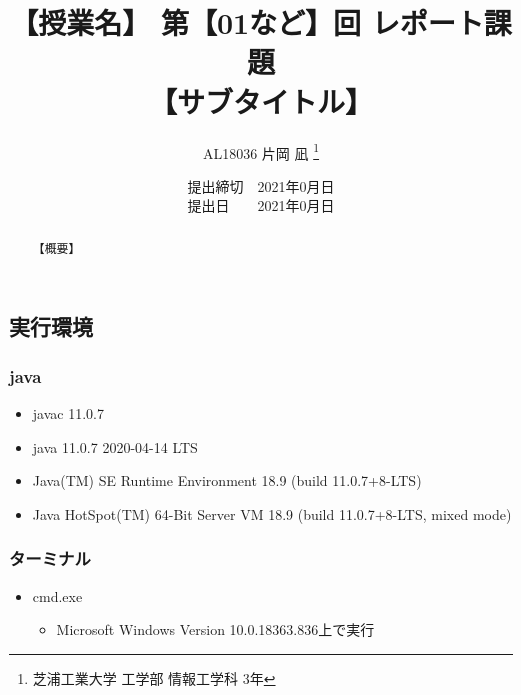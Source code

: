 \documentclass[a4paper, papersize]{jsarticle}
\title{
\vspace{-2cm} %
【授業名】 第【01など】回 レポート課題 \\
【サブタイトル】}
\author{AL18036 片岡 凪 \thanks{芝浦工業大学 工学部 情報工学科 3年}}
\date{提出締切　2021年0月日 \\
提出日　　2021年0月日}
\begin{document}
\maketitle


\setcounter{tocdepth}{2}
\tableofcontents
\newpage


\begin{abstract}
  【概要】
\end{abstract}


\begin{multicols}{2}


  \section{実行環境}
  \subsubsection{java}
  \begin{itemize}
    \item javac 11.0.7
    \item java 11.0.7 2020-04-14 LTS
    \item Java(TM) SE Runtime Environment 18.9 (build 11.0.7+8-LTS)
    \item Java HotSpot(TM) 64-Bit Server VM 18.9 (build 11.0.7+8-LTS, mixed mode)
  \end{itemize}


  \subsubsection{ターミナル}
  \begin{itemize}
    \item cmd.exe
          \begin{itemize}
            \item Microsoft Windows Version 10.0.18363.836上で実行
          \end{itemize}
  \end{itemize}


\end{multicols}
\end{document}
